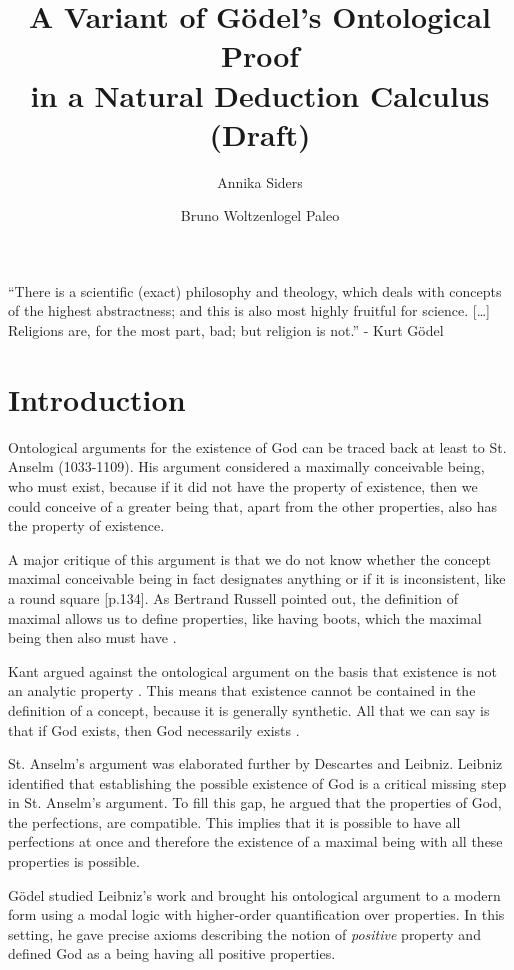 \documentclass{llncs}
\title{A Variant of G\"{o}del's Ontological Proof \\
in a Natural Deduction Calculus \\
(Draft)}
\author{Annika Siders\inst{1} \and Bruno Woltzenlogel Paleo\inst{2}}
\institute{
  Helsinki, Finland\\
  \email{annika.siders@helsinki.fi}
  \and 
  Vienna, Austria \\
  \email{bruno@logic.at}
}
\begin{document}
\maketitle

\newcommand{\ess}[2]{#1 \ \mathit{ess} \ #2}
\newcommand{\NE}{E}


\noindent
``There is a scientific (exact) philosophy and theology,
which deals with concepts of the highest abstractness; and this is also most highly fruitful for science. [\ldots] Religions are, for the most part, bad; but religion is not.'' - Kurt G\"{o}del

\section{Introduction}

Ontological arguments for the existence of God can be traced back at least to St. Anselm (1033-1109). His argument considered a maximally conceivable being, who must exist, because if it did not have the property of existence, then we could conceive of a greater being that, apart from the other properties, also has the property of existence. 

A major critique of this argument is that we do not know whether the concept maximal conceivable being in fact designates anything or if it is inconsistent, like a round square \citep{fitting}[p.134].  
As Bertrand Russell pointed out, the definition of maximal allows us to define properties, like having boots, which the maximal being then also must have \citep{citation needed}. 

Kant argued against the ontological argument on the basis that existence is not an analytic property \citep{kant}. This means that existence cannot be contained in the definition of a concept, because it is generally synthetic. All that we can say is that if God exists, then God necessarily exists \citep{citation needed}.

St. Anselm's argument was elaborated further by Descartes and Leibniz. Leibniz identified that establishing the possible existence of God is a critical missing step in St. Anselm's argument. To fill this gap, he argued that the properties of God, the perfections, are compatible. This implies that it is possible to have all perfections at once and therefore the existence of a maximal being with all these properties is possible. 

G\"odel studied Leibniz's work \citep{Adams} and brought his ontological argument to a modern form using a modal logic with higher-order quantification over properties. In this setting, he gave precise axioms describing the notion of \emph{positive} property and defined God as a being having all positive properties. 
\end{document}

